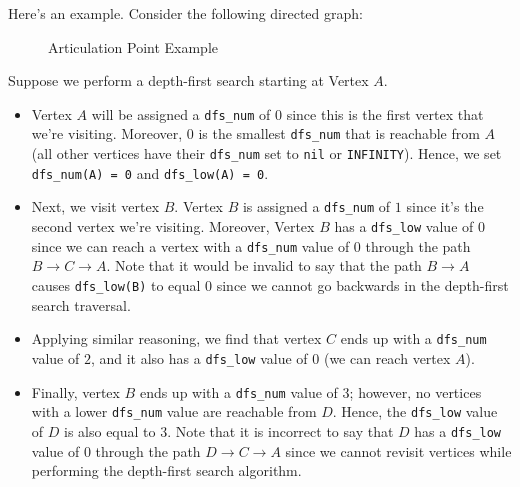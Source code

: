Here's an example. Consider the following directed graph: 
  
  
\begin{figure}[h]
\centering
{}
\caption{Articulation Point Example}
\end{figure}

Suppose we perform a depth-first search starting at Vertex $A$. 

\begin{itemize}
    \item Vertex $A$ will be assigned a \verb!dfs_num! of $0$ since this is the first vertex that we're visiting. Moreover, $0$ is the smallest \verb!dfs_num! that is reachable from $A$ (all other vertices have their \verb!dfs_num! set to \verb!nil! or \verb!INFINITY!). Hence, we set \verb!dfs_num(A) = 0! and \verb!dfs_low(A) = 0!. 
    \item Next, we visit vertex $B$. Vertex $B$ is assigned a \verb!dfs_num! of $1$ since it's the second vertex we're visiting. Moreover, Vertex $B$ has a \verb!dfs_low! value of $0$ since we can reach a vertex with a \verb!dfs_num! value of $0$ through the path $B \rightarrow C \rightarrow A$. Note that it would be invalid to say that the path $B \rightarrow A$ causes \verb!dfs_low(B)! to equal $0$ since we cannot go backwards in the depth-first search traversal. 
    \item Applying similar reasoning, we find that vertex $C$ ends up with a \verb!dfs_num! value of $2$, and it also has a \verb!dfs_low! value of $0$ (we can reach vertex $A$).
    \item Finally, vertex $B$ ends up with a \verb!dfs_num! value of $3$; however, no vertices with a lower \verb!dfs_num! value are reachable from $D$. Hence, the \verb!dfs_low! value of $D$ is also equal to $3$. Note that it is incorrect to say that $D$ has a \verb!dfs_low! value of $0$ through the path $D\rightarrow C\rightarrow A$ since we cannot revisit vertices while performing the depth-first search algorithm. 
\end{itemize}


